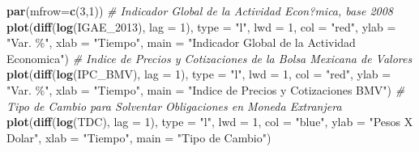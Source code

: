 \documentclass[
]{book}
\newenvironment{Shaded}{\begin{snugshade}}{\end{snugshade}}
\newcommand{\AttributeTok}[1]{\textcolor[rgb]{0.13,0.29,0.53}{#1}}
\newcommand{\CommentTok}[1]{\textcolor[rgb]{0.56,0.35,0.01}{\textit{#1}}}
\newcommand{\DecValTok}[1]{\textcolor[rgb]{0.00,0.00,0.81}{#1}}
\newcommand{\FunctionTok}[1]{\textcolor[rgb]{0.13,0.29,0.53}{\textbf{#1}}}
\newcommand{\NormalTok}[1]{#1}
\newcommand{\StringTok}[1]{\textcolor[rgb]{0.31,0.60,0.02}{#1}}
\begin{document}
\begin{Shaded}
\begin{Highlighting}[]
\FunctionTok{par}\NormalTok{(}\AttributeTok{mfrow=}\FunctionTok{c}\NormalTok{(}\DecValTok{3}\NormalTok{,}\DecValTok{1}\NormalTok{))}
\CommentTok{\# Indicador Global de la Actividad Econ?mica, base 2008}
\FunctionTok{plot}\NormalTok{(}\FunctionTok{diff}\NormalTok{(}\FunctionTok{log}\NormalTok{(IGAE\_2013), }\AttributeTok{lag =} \DecValTok{1}\NormalTok{), }\AttributeTok{type =} \StringTok{"l"}\NormalTok{, }\AttributeTok{lwd =} \DecValTok{1}\NormalTok{, }
     \AttributeTok{col =} \StringTok{"red"}\NormalTok{, }\AttributeTok{ylab =} \StringTok{"Var. \%"}\NormalTok{, }\AttributeTok{xlab =} \StringTok{"Tiempo"}\NormalTok{, }
     \AttributeTok{main =} \StringTok{"Indicador Global de la Actividad Economica"}\NormalTok{) }
\CommentTok{\# Indice de Precios y Cotizaciones de la Bolsa Mexicana de Valores}
\FunctionTok{plot}\NormalTok{(}\FunctionTok{diff}\NormalTok{(}\FunctionTok{log}\NormalTok{(IPC\_BMV), }\AttributeTok{lag =} \DecValTok{1}\NormalTok{), }\AttributeTok{type =} \StringTok{"l"}\NormalTok{, }\AttributeTok{lwd =} \DecValTok{1}\NormalTok{, }
     \AttributeTok{col =} \StringTok{"red"}\NormalTok{, }\AttributeTok{ylab =} \StringTok{"Var. \%"}\NormalTok{, }\AttributeTok{xlab =} \StringTok{"Tiempo"}\NormalTok{, }
     \AttributeTok{main =} \StringTok{"Indice de Precios y Cotizaciones BMV"}\NormalTok{)}
\CommentTok{\# Tipo de Cambio para Solventar Obligaciones en Moneda Extranjera}
\FunctionTok{plot}\NormalTok{(}\FunctionTok{diff}\NormalTok{(}\FunctionTok{log}\NormalTok{(TDC), }\AttributeTok{lag =} \DecValTok{1}\NormalTok{), }\AttributeTok{type =} \StringTok{"l"}\NormalTok{, }\AttributeTok{lwd =} \DecValTok{1}\NormalTok{, }
     \AttributeTok{col =} \StringTok{"blue"}\NormalTok{, }\AttributeTok{ylab =} \StringTok{"Pesos X Dolar"}\NormalTok{, }\AttributeTok{xlab =} \StringTok{"Tiempo"}\NormalTok{, }
     \AttributeTok{main =} \StringTok{"Tipo de Cambio"}\NormalTok{)}
\end{Highlighting}
\end{Shaded}
\end{document}
